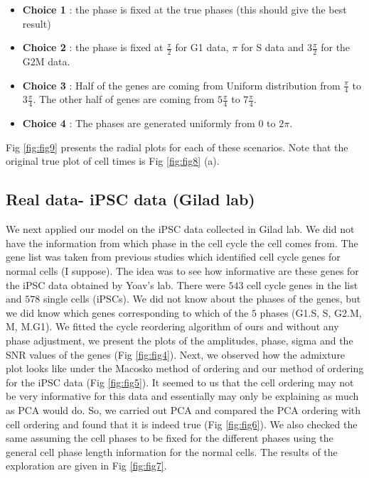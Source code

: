 \documentclass[11pt]{article}
\begin{document}
\begin{itemize}

\item \textbf{Choice 1} :  the phase is fixed at the true phases (this should give the best result)
\item \textbf{Choice 2} :  the phase is fixed at $\frac{\pi}{2}$ for G1 data, $\pi$ for S data and $3 \frac{\pi}{2}$ for the G2M data.
\item \textbf{Choice 3} :  Half of the genes are coming from Uniform distribution from $\frac{\pi}{4}$ to $3 \frac{\pi}{4}$. The other half of genes are coming from $5 \frac{\pi}{4}$ to $7 \frac{\pi}{4}$. 
\item \textbf{Choice 4} : The phases are generated uniformly from $0$ to $2 \pi$. 

\end{itemize}

Fig \ref{fig:fig9} presents the radial plots for each of these scenarios. Note that the original true plot of cell times is Fig \ref{fig:fig8} (a).  



\subsection{Real data- iPSC data (Gilad lab)}

We next applied our model on the iPSC data collected in Gilad lab. We did not have the information from which phase in the cell cycle the cell comes from. The gene list was taken from previous studies which identified cell cycle genes for normal cells (I suppose). The idea was to see how informative are these genes for the iPSC data obtained by Yoav's lab. There were $543$ cell cycle genes in the list and $578$ single cells (iPSCs).  We did not know about the phases of the genes, but we did know which genes corresponding to which of the $5$ phases (G1.S, S, G2.M, M, M.G1).  We fitted the cycle reordering algorithm of ours and without any phase adjustment, we present the plots of the amplitudes, phase, sigma and the SNR values of the genes (Fig \ref{fig:fig4}). Next, we observed how the admixture plot looks like under the Macosko method of ordering and our method of ordering for the iPSC data (Fig \ref{fig:fig5}).  It seemed to us that the cell ordering may not be very informative for this data and essentially may only be explaining as much as PCA would do. So, we carried out PCA and compared the PCA ordering with cell ordering and found that it is indeed true (Fig \ref{fig:fig6}). We also checked the same assuming the cell phases to be fixed for the different phases using the general cell phase length information for the normal cells. The results of the exploration are given in Fig \ref{fig:fig7}.
\end{document}
